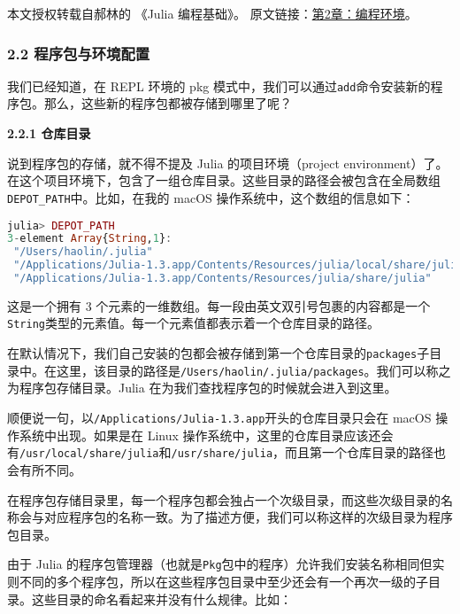 
本文授权转载自郝林的 《Julia 编程基础》。 原文链接：\href{https://github.com/hyper0x/JuliaBasics/blob/master/book/ch02.md}{第2章：编程环境}。


\subsubsection{2.2 程序包与环境配置}

我们已经知道，在 REPL 环境的 pkg 模式中，我们可以通过\verb|add|命令安装新的程序包。那么，这些新的程序包都被存储到哪里了呢？

\textbf{2.2.1 仓库目录}

说到程序包的存储，就不得不提及 Julia 的项目环境（project environment）了。在这个项目环境下，包含了一组仓库目录。这些目录的路径会被包含在全局数组\verb|DEPOT_PATH|中。比如，在我的 macOS 操作系统中，这个数组的信息如下：

\begin{lstlisting}[language=julia]
julia> DEPOT_PATH
3-element Array{String,1}:
 "/Users/haolin/.julia"                                                  
 "/Applications/Julia-1.3.app/Contents/Resources/julia/local/share/julia"
 "/Applications/Julia-1.3.app/Contents/Resources/julia/share/julia" 
\end{lstlisting}

这是一个拥有 3 个元素的一维数组。每一段由英文双引号包裹的内容都是一个\verb|String|类型的元素值。每一个元素值都表示着一个仓库目录的路径。

在默认情况下，我们自己安装的包都会被存储到第一个仓库目录的\verb|packages|子目录中。在这里，该目录的路径是\verb|/Users/haolin/.julia/packages|。我们可以称之为程序包存储目录。Julia 在为我们查找程序包的时候就会进入到这里。

顺便说一句，以\verb|/Applications/Julia-1.3.app|开头的仓库目录只会在 macOS 操作系统中出现。如果是在 Linux 操作系统中，这里的仓库目录应该还会有\verb|/usr/local/share/julia|和\verb|/usr/share/julia|，而且第一个仓库目录的路径也会有所不同。

在程序包存储目录里，每一个程序包都会独占一个次级目录，而这些次级目录的名称会与对应程序包的名称一致。为了描述方便，我们可以称这样的次级目录为程序包目录。

由于 Julia 的程序包管理器（也就是\verb|Pkg|包中的程序）允许我们安装名称相同但实则不同的多个程序包，所以在这些程序包目录中至少还会有一个再次一级的子目录。这些目录的命名看起来并没有什么规律。比如：


